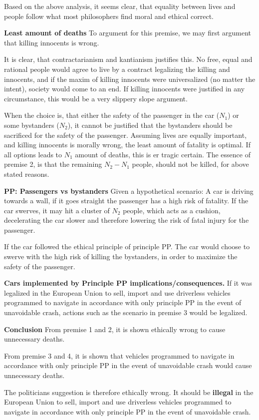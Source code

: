 Based on the above analysis, it seems clear, that equality between lives and people follow what most philosophers find moral and ethical correct.



\textbf{Least amount of deaths}
To argument for this premise, we may first argument that killing innocents is wrong.

It is clear, that contractarianism and kantianism justifies this. No free, equal and rational people would agree to live by a contract legalizing the killing and innocents, and if the maxim of killing innocents were universalized (no matter the intent), society would come to an end. If killing innocents were justified in any circumstance, this would be a very slippery slope argument. 

When the choice is, that either the safety of the passenger in the car ($N_1$) or some bystanders ($N_2$), it cannot be justified that the bystanders should be sacrificed for the safety of the passenger. Assuming lives are equally important, and killing innocents is morally wrong, the least amount of fatality is optimal. If all options leads to $N_1$ amount of deaths, this is er tragic certain. The essence of premise 2, is that the remaining $N_2 - N_1$ people, should not be killed, for above stated reasons.


\textbf{PP: Passengers vs bystanders}
Given a hypothetical scenario: A car is driving towards a wall, if it goes straight the passenger has a high risk of fatality. If the car swerves, it may hit a cluster of $N_2$ people, which acts as a cushion, decelerating the car slower and therefore lowering the risk of fatal injury for the passenger.

If the car followed the ethical principle of principle PP. The car would choose to swerve with the high risk of killing the bystanders, in order to maximize the safety of the passenger.

\textbf{Cars implemented by Principle PP implications/consequences. }
If it was legalized in the European Union to sell, import and use driverless vehicles programmed to navigate in accordance with only principle PP in the event of unavoidable crash, actions such as the scenario in premise 3 would be legalized. 



\textbf{Conclusion}
From premise 1 and 2, it is shown ethically wrong to cause unnecessary deaths.

From premise 3 and 4, it is shown that vehicles programmed to navigate in accordance with only principle PP in the event of unavoidable crash would cause unnecessary deaths.

The politicians suggestion is therefore ethically wrong.
It should be \textbf{illegal} in the European Union to sell, import and use driverless vehicles programmed to navigate in accordance with only principle PP in the event of unavoidable crash.